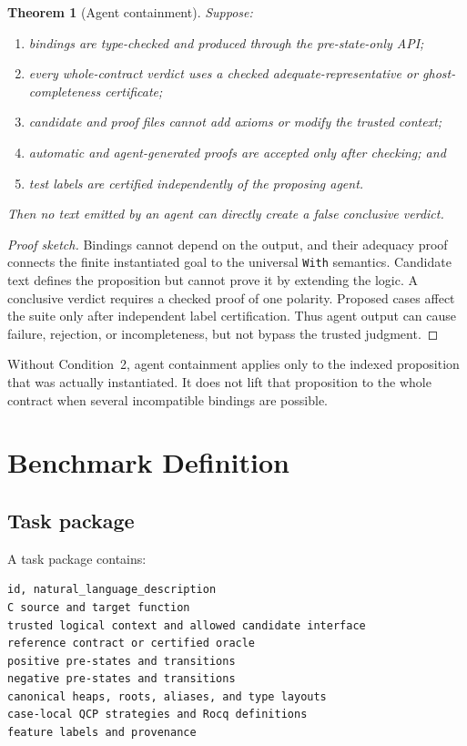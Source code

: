 \documentclass[10pt]{article}
\newtheorem{theorem}{Theorem}
\begin{document}
\begin{theorem}[Agent containment]
Suppose:
\begin{enumerate}[leftmargin=1.4em]
  \item bindings are type-checked and produced through the pre-state-only API;
  \item every whole-contract verdict uses a checked adequate-representative or
        ghost-completeness certificate;
  \item candidate and proof files cannot add axioms or modify the trusted
        context;
  \item automatic and agent-generated proofs are accepted only after checking;
        and
  \item test labels are certified independently of the proposing agent.
\end{enumerate}
Then no text emitted by an agent can directly create a false conclusive
verdict.
\end{theorem}
\begin{proof}[Proof sketch]
Bindings cannot depend on the output, and their adequacy proof connects the
finite instantiated goal to the universal \texttt{With} semantics.  Candidate
text defines the proposition but cannot prove it by extending the logic.  A
conclusive verdict requires a checked proof of one polarity.  Proposed cases
affect the suite only after independent label certification.  Thus agent
output can cause failure, rejection, or incompleteness, but not bypass the
trusted judgment.
\end{proof}

Without Condition~2, agent containment applies only to the indexed proposition
that was actually instantiated.  It does not lift that proposition to the
whole contract when several incompatible bindings are possible.

\section{Benchmark Definition}
\label{sec:benchmark}

\subsection{Task package}

A task package contains:

\begin{verbatim}
id, natural_language_description
C source and target function
trusted logical context and allowed candidate interface
reference contract or certified oracle
positive pre-states and transitions
negative pre-states and transitions
canonical heaps, roots, aliases, and type layouts
case-local QCP strategies and Rocq definitions
feature labels and provenance
\end{verbatim}
\end{document}

